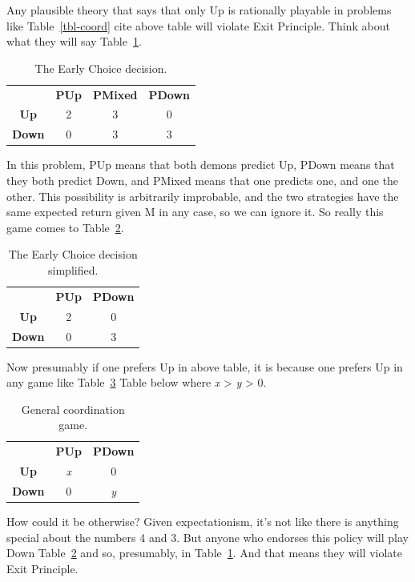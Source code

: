 \documentclass[
  12pt,
  letterpaper,
  DIV=11,
  numbers=noendperiod]{scrreprt}
\begin{document}
Any plausible theory that says that only Up is rationally playable in
problems like Table~\ref{tbl-coord} cite above table will violate Exit
Principle. Think about what they will say Table~\ref{tbl-early-choice}.

\begin{longtable}[]{@{}cccc@{}}
\caption{The Early Choice
decision.}\label{tbl-early-choice}\tabularnewline
\toprule\noalign{}
\endfirsthead
\endhead
\bottomrule\noalign{}
\endlastfoot
& \textbf{PUp} & \textbf{PMixed} & \textbf{PDown} \\
\textbf{Up} & 2 & 3 & 0 \\
\textbf{Down} & 0 & 3 & 3 \\
\end{longtable}

In this problem, PUp means that both demons predict Up, PDown means that
they both predict Down, and PMixed means that one predicts one, and one
the other. This possibility is arbitrarily improbable, and the two
strategies have the same expected return given M in any case, so we can
ignore it. So really this game comes to
Table~\ref{tbl-early-choice-simplified}.

\begin{longtable}[]{@{}ccc@{}}
\caption{The Early Choice decision
simplified.}\label{tbl-early-choice-simplified}\tabularnewline
\toprule\noalign{}
\endfirsthead
\endhead
\bottomrule\noalign{}
\endlastfoot
& \textbf{PUp} & \textbf{PDown} \\
\textbf{Up} & 2 & 0 \\
\textbf{Down} & 0 & 3 \\
\end{longtable}

Now presumably if one prefers Up in above table, it is because one
prefers Up in any game like Table~\ref{tbl-general-coord} Table below
where \emph{x} \textgreater{} \emph{y} \textgreater{} 0.

\begin{longtable}[]{@{}ccc@{}}
\caption{General coordination
game.}\label{tbl-general-coord}\tabularnewline
\toprule\noalign{}
\endfirsthead
\endhead
\bottomrule\noalign{}
\endlastfoot
& \textbf{PUp} & \textbf{PDown} \\
\textbf{Up} & \emph{x} & 0 \\
\textbf{Down} & 0 & \emph{y} \\
\end{longtable}

How could it be otherwise? Given expectationism, it's not like there is
anything special about the numbers 4 and 3. But anyone who endorses this
policy will play Down Table~\ref{tbl-early-choice-simplified} and so,
presumably, in Table~\ref{tbl-early-choice}. And that means they will
violate Exit Principle.
\end{document}
